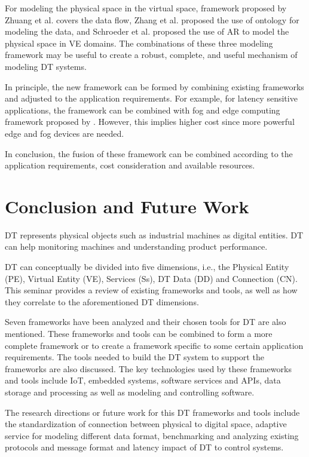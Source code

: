 \documentclass[article,table]{aaltoseries}
\begin{document}
For modeling the physical space in the virtual space, framework proposed by Zhuang et al. \cite{Zhuang2018} covers the data flow, Zhang et al. \cite{Zhang2017} proposed the use of ontology for modeling the data, and Schroeder et al. \cite{schroeder2016visualising} proposed the use of AR to model the physical space in VE domains. The combinations of these three modeling framework may be useful to create a robust, complete, and useful mechanism of modeling DT systems.

In principle, the new framework can be formed by combining existing frameworks and adjusted to the application requirements. For example, for latency sensitive applications, the framework can be combined with fog and edge computing framework proposed by \cite{qi2018modeling}. However, this implies higher cost since more powerful edge and fog devices are needed.

In conclusion, the fusion of these framework can be combined according to the application requirements, cost consideration and available resources. 

\section{Conclusion and Future Work}
DT represents physical objects such as industrial machines as digital entities. DT can help monitoring machines and understanding product performance.

DT can conceptually be divided into five dimensions, i.e., the Physical Entity (PE), Virtual Entity (VE), Services (Ss), DT Data (DD) and Connection (CN). This seminar provides a review of existing frameworks and tools, as well as how they correlate to the aforementioned DT dimensions.

Seven frameworks have been analyzed and their chosen tools for DT are also mentioned. These frameworks and tools can be combined to form a more complete framework or to create a framework specific to some certain application requirements. The tools needed to build the DT system to support the frameworks are also discussed. The key technologies used by these frameworks and tools include IoT, embedded systems, software services and APIs, data storage and processing as well as modeling and controlling software.

The research directions or future work for this DT frameworks and tools include the standardization of connection between physical to digital space, adaptive service for modeling different data format, benchmarking and analyzing existing protocols and message format and latency impact of DT to control systems.

 




\end{document}
